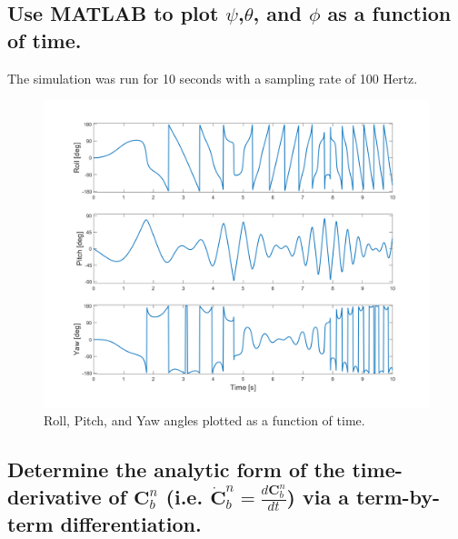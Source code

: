 \documentclass[12pt,letterpaper, onecolumn]{exam}
\begin{document}
\begin{questions}
\begin{parts}
        \part{Use MATLAB to plot $\psi$,$\theta$, and $\phi$ as a function of time.}

        The simulation was run for 10 seconds with a sampling rate of 100 Hertz.

        \begin{figure}[!h]
            \centering
            \includegraphics[width=0.8\linewidth]{Euler_Angles.png}
            \caption{Roll, Pitch, and Yaw angles plotted as a function of time.}
            \label{fig:euler}
        \end{figure}

    \end{parts}
    \clearpage
    \begin{parts}
        \part{Determine the analytic form of the time-derivative of $\mathbf{C}^n_b$ (i.e. $\dot{\mathbf{C}}^n_b = \frac{d\mathbf{C}^n_b}{dt}$) via a term-by-term differentiation.}




\end{parts}
\end{questions}
\end{document}
